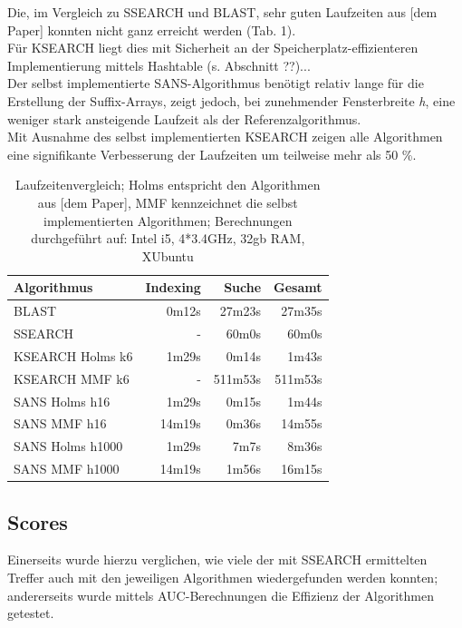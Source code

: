 \documentclass{article}
\begin{document}
Die, im Vergleich zu SSEARCH und BLAST, sehr guten Laufzeiten aus [dem Paper] konnten nicht ganz erreicht werden (Tab. 1).\\Für KSEARCH liegt dies mit Sicherheit an der Speicherplatz-effizienteren Implementierung mittels Hashtable (s. Abschnitt ??)...\\Der selbst implementierte SANS-Algorithmus benötigt relativ lange für die Erstellung der Suffix-Arrays, zeigt jedoch, bei zunehmender Fensterbreite \textit h, eine weniger stark ansteigende Laufzeit als der Referenzalgorithmus.\\Mit Ausnahme des selbst implementierten KSEARCH zeigen alle Algorithmen eine signifikante Verbesserung der Laufzeiten um teilweise mehr als 50 \%.
  \begin{table}[h]
    \caption{Laufzeitenvergleich; Holms entspricht den Algorithmen aus [dem Paper], MMF kennzeichnet die selbst implementierten Algorithmen; Berechnungen durchgeführt auf: Intel i5, 4*3.4GHz, 32gb RAM, XUbuntu}
    \begin{center}
    \begin{tabular}{lrrr}
    \hline
    Algorithmus & Indexing & Suche & Gesamt\\
    \hline
    BLAST & 0m12s & 27m23s & 27m35s\\
    SSEARCH & - & 60m0s & 60m0s\\
    KSEARCH Holms k6 & 1m29s & 0m14s & 1m43s\\
    KSEARCH MMF k6 & -  & 511m53s & 511m53s\\
    SANS Holms h16 & 1m29s &  0m15s & 1m44s\\
    SANS MMF  h16 & 14m19s & 0m36s & 14m55s\\
    SANS Holms h1000 & 1m29s & 7m7s & 8m36s\\
    SANS MMF  h1000 & 14m19s & 1m56s & 16m15s\\
    \hline
    \end{tabular}
    \end{center}
  \end{table}

\subsection{Scores}

Einerseits wurde hierzu verglichen, wie viele der mit SSEARCH ermittelten Treffer auch mit den jeweiligen Algorithmen wiedergefunden werden konnten; andererseits wurde mittels AUC-Berechnungen die Effizienz der Algorithmen getestet.
\end{document}
